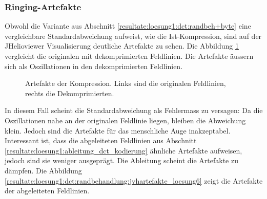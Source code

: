 \subsubsection{Ringing-Artefakte}\label{resultate:loesung1:ringing}
Obwohl die Variante aus Abschnitt \ref{resultate:loesung1:dct:randbeh+byte} eine vergleichbare Standardabweichung aufweist, wie die Ist-Kompression, sind auf der JHelioviewer Visualisierung deutliche Artefakte zu sehen. Die Abbildung \ref{resultate:loesung1:dct:randbehandlung:jvhartefakte} vergleicht die originalen mit dekomprimierten Feldlinien. Die Artefakte äussern sich als Oszillationen in den dekomprimierten Feldlinien.

\begin{figure}[!htbp]
	\center
	\caption{Artefakte der Kompression. Links sind die originalen Feldlinien, rechts die Dekomprimierten.}
	\label{resultate:loesung1:dct:randbehandlung:jvhartefakte}
\end{figure} 
In diesem Fall scheint die Standardabweichung als Fehlermass zu versagen: Da die Oszillationen nahe an der originalen Feldlinie liegen, bleiben die Abweichung klein. Jedoch sind die Artefakte für das menschliche Auge inakzeptabel. Interessant ist, dass die abgeleiteten Feldlinien aus Abschnitt \ref{resultate:loesung1:ableitung_dct_kodierung} ähnliche Artefakte aufweisen, jedoch sind sie weniger ausgeprägt. Die Ableitung scheint die Artefakte zu dämpfen. Die Abbildung \ref{resultate:loesung1:dct:randbehandlung:jvhartefakte_loesung6} zeigt die Artefakte der abgeleiteten Feldlinien.

